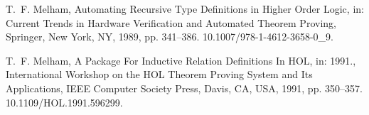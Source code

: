 \documentclass[GCNS]{yincog}
\theoremstyle{remark}
\theoremstyle{theorem}
\theoremstyle{remark}
\begin{document}
\begin{backmatter}
\begin{thebibliography}{}
\begin{bsubitem}
\begin{bcontribution}%
\end{bcontribution}
\begin{bhost}
\begin{beditedbook}
\end{beditedbook}
\end{bhost}
\end{bsubitem}
%
\OrigBibText
T.~F. Melham, {Automating Recursive Type Definitions in Higher Order Logic},
in: Current Trends in Hardware Verification and Automated Theorem Proving,
Springer, New York, NY, 1989, pp. 341--386. 10.1007/978-1-4612-3658-0\_9.
\endOrigBibText
{}%
\endbibitem

\begin{bsubitem}
\begin{bcontribution}%
\end{bcontribution}
\begin{bhost}
\begin{beditedbook}
\end{beditedbook}
\end{bhost}
\end{bsubitem}
%
\OrigBibText
T.~F. Melham, {A Package For Inductive Relation Definitions In HOL}, in:
1991., International Workshop on the HOL Theorem Proving System and Its
Applications, IEEE Computer Society Press, Davis, CA, USA, 1991, pp. 350--357.
10.1109/HOL.1991.596299.
\endOrigBibText
{}%
\endbibitem


\end{thebibliography}
\end{backmatter}
\end{document}
